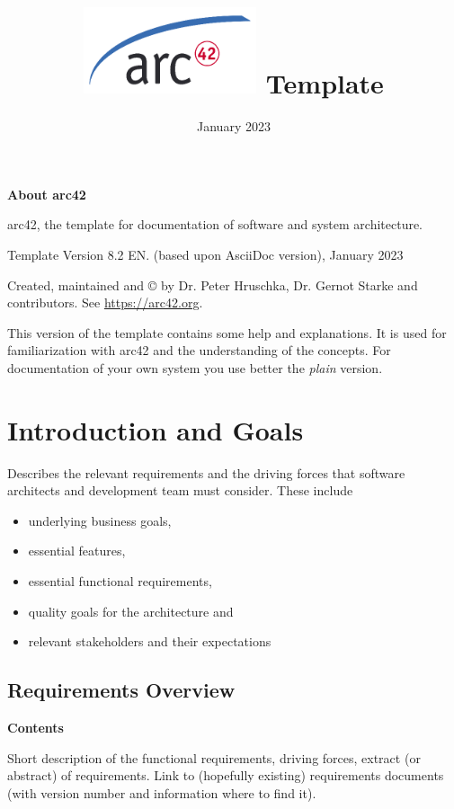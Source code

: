 \documentclass[
]{article}
\title{\includegraphics{images/arc42-logo.png} Template}
\author{}
\date{January 2023}
\begin{document}
\maketitle

\section{}

\textbf{About arc42}

arc42, the template for documentation of software and system
architecture.

Template Version 8.2 EN. (based upon AsciiDoc version), January 2023

Created, maintained and © by Dr. Peter Hruschka, Dr. Gernot Starke and
contributors. See \url{https://arc42.org}.

This version of the template contains some help and explanations. It is
used for familiarization with arc42 and the understanding of the
concepts. For documentation of your own system you use better the
\emph{plain} version.

\hypertarget{section-introduction-and-goals}{%
\section{Introduction and Goals}\label{section-introduction-and-goals}}

Describes the relevant requirements and the driving forces that software
architects and development team must consider. These include

\begin{itemize}
\item
  underlying business goals,
\item
  essential features,
\item
  essential functional requirements,
\item
  quality goals for the architecture and
\item
  relevant stakeholders and their expectations
\end{itemize}

\hypertarget{_requirements_overview}{%
\subsection{Requirements Overview}\label{_requirements_overview}}

\textbf{Contents}

Short description of the functional requirements, driving forces,
extract (or abstract) of requirements. Link to (hopefully existing)
requirements documents (with version number and information where to
find it).
\end{document}
